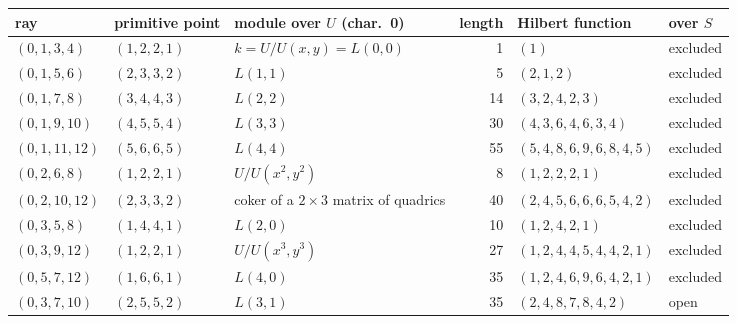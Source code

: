 \begin{tabular}{@{}ll>{\raggedright\arraybackslash}p{3.9cm}r>{\raggedright\arraybackslash}p{4cm}l@{}}
\toprule
ray & primitive point & module over $U$ (char.\ 0) & length & Hilbert function & over $S$\\
\midrule
$(0,1,3,4)$ & $(1,2,2,1)$ & $k=U/U(x,y)=L(0,0)$ & 1 & $(1)$ & excluded\\
$(0,1,5,6)$ & $(2,3,3,2)$ & $L(1,1)$ & 5 & $(2,1,2)$ & excluded\\
$(0,1,7,8)$ & $(3,4,4,3)$ & $L(2,2)$ & 14 & $(3,2,4,2,3)$ & excluded\\
$(0,1,9,10)$ & $(4,5,5,4)$ & $L(3,3)$ & 30 & $(4,3,6,4,6,3,4)$ & excluded\\
$(0,1,11,12)$ & $(5,6,6,5)$ & $L(4,4)$ & 55 & $(5,4,8,6,9,6,8,4,5)$ & excluded\\
$(0,2,6,8)$ & $(1,2,2,1)$ & $U/U(x^2,y^2)$ & 8 & $(1,2,2,2,1)$ & excluded\\
$(0,2,10,12)$ & $(2,3,3,2)$ & coker of a $2\times3$ matrix of quadrics & 40 & $(2,4,5,6,6,6,5,4,2)$ & excluded\\
$(0,3,5,8)$ & $(1,4,4,1)$ & $L(2,0)$ & 10 & $(1,2,4,2,1)$ & excluded\\
$(0,3,9,12)$ & $(1,2,2,1)$ & $U/U(x^3,y^3)$ & 27 & $(1,2,4,4,5,4,4,2,1)$ & excluded\\
$(0,5,7,12)$ & $(1,6,6,1)$ & $L(4,0)$ & 35 & $(1,2,4,6,9,6,4,2,1)$ & excluded\\
$(0,3,7,10)$ & $(2,5,5,2)$ & $L(3,1)$ & 35 & $(2,4,8,7,8,4,2)$ & open\\
\bottomrule
\end{tabular}

